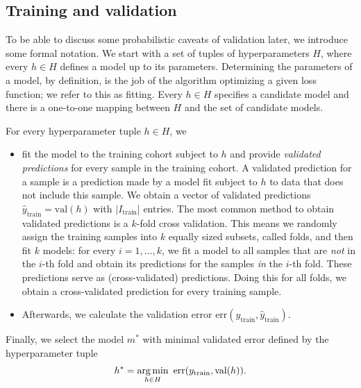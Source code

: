 \subsection{Training and validation}\label{subsec:train-val}

To be able to discuss some probabilistic caveats of validation later, we introduce some formal 
notation. We start with a set of tuples of hyperparameters $H$, where every $h \in H$ defines a model
up to its parameters. Determining the parameters of a model, by definition, is the job of the 
algorithm optimizing a given loss function; we refer to this as fitting. Every $h \in H$ specifies 
a candidate model and there is a one-to-one mapping between $H$ and the set of candidate models.

For every hyperparameter tuple $h \in H$, we
\begin{itemize}
    \item fit the model to the training cohort subject to $h$ and provide 
        \textit{validated predictions} for 
        every sample in the training cohort.
        A validated prediction for a sample is a prediction made by a model fit 
        subject to $h$ to data that does not include this sample. We obtain a vector of validated 
        predictions $\hat{y}_\text{train} = \text{val}(h)$ with $|I_\text{train}$| entries.
        The most common method to obtain validated predictions is a $k$-fold cross validation.
        This means we randomly assign the training samples into $k$ equally sized subsets, called 
        folds, and then fit $k$ models: for every $i = 1, \ldots, k$, we fit a model to all 
        samples that are \textit{not} in the $i$-th fold and obtain its predictions for the samples 
        \textit{in} the $i$-th fold. These predictions serve as (cross-validated) predictions. 
        Doing this for all 
        folds, we obtain a cross-validated prediction for every training sample.
    \item Afterwards, we calculate the validation error 
        $\text{err}(y_\text{train}, \hat{y}_\text{train})$.
\end{itemize}
Finally, we select the model $m^*$ with minimal validated error defined by the hyperparameter tuple 
\begin{align}
    h^* = \operatorname*{arg\,min}_{h \in H} \ \text{err}(y_\text{train}, \text{val}(h)).
\end{align}

